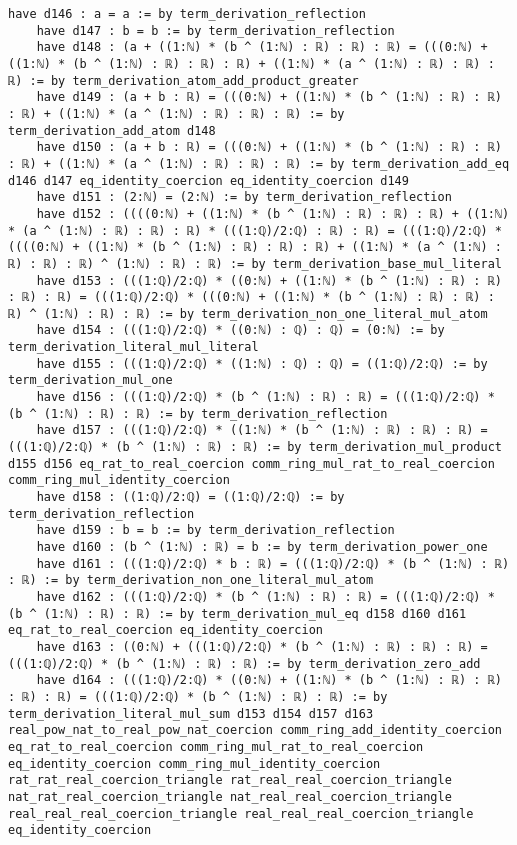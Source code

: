 \documentclass{article}
\begin{document}
\begin{tcolorbox}[colback=white!10, width=\linewidth]
\begin{lstlisting}[language=Lean4]
    have d146 : a = a := by term_derivation_reflection
    have d147 : b = b := by term_derivation_reflection
    have d148 : (a + ((1:ℕ) * (b ^ (1:ℕ) : ℝ) : ℝ) : ℝ) = (((0:ℕ) + ((1:ℕ) * (b ^ (1:ℕ) : ℝ) : ℝ) : ℝ) + ((1:ℕ) * (a ^ (1:ℕ) : ℝ) : ℝ) : ℝ) := by term_derivation_atom_add_product_greater
    have d149 : (a + b : ℝ) = (((0:ℕ) + ((1:ℕ) * (b ^ (1:ℕ) : ℝ) : ℝ) : ℝ) + ((1:ℕ) * (a ^ (1:ℕ) : ℝ) : ℝ) : ℝ) := by term_derivation_add_atom d148
    have d150 : (a + b : ℝ) = (((0:ℕ) + ((1:ℕ) * (b ^ (1:ℕ) : ℝ) : ℝ) : ℝ) + ((1:ℕ) * (a ^ (1:ℕ) : ℝ) : ℝ) : ℝ) := by term_derivation_add_eq d146 d147 eq_identity_coercion eq_identity_coercion d149
    have d151 : (2:ℕ) = (2:ℕ) := by term_derivation_reflection
    have d152 : ((((0:ℕ) + ((1:ℕ) * (b ^ (1:ℕ) : ℝ) : ℝ) : ℝ) + ((1:ℕ) * (a ^ (1:ℕ) : ℝ) : ℝ) : ℝ) * (((1:ℚ)/2:ℚ) : ℝ) : ℝ) = (((1:ℚ)/2:ℚ) * ((((0:ℕ) + ((1:ℕ) * (b ^ (1:ℕ) : ℝ) : ℝ) : ℝ) + ((1:ℕ) * (a ^ (1:ℕ) : ℝ) : ℝ) : ℝ) ^ (1:ℕ) : ℝ) : ℝ) := by term_derivation_base_mul_literal
    have d153 : (((1:ℚ)/2:ℚ) * ((0:ℕ) + ((1:ℕ) * (b ^ (1:ℕ) : ℝ) : ℝ) : ℝ) : ℝ) = (((1:ℚ)/2:ℚ) * (((0:ℕ) + ((1:ℕ) * (b ^ (1:ℕ) : ℝ) : ℝ) : ℝ) ^ (1:ℕ) : ℝ) : ℝ) := by term_derivation_non_one_literal_mul_atom
    have d154 : (((1:ℚ)/2:ℚ) * ((0:ℕ) : ℚ) : ℚ) = (0:ℕ) := by term_derivation_literal_mul_literal
    have d155 : (((1:ℚ)/2:ℚ) * ((1:ℕ) : ℚ) : ℚ) = ((1:ℚ)/2:ℚ) := by term_derivation_mul_one
    have d156 : (((1:ℚ)/2:ℚ) * (b ^ (1:ℕ) : ℝ) : ℝ) = (((1:ℚ)/2:ℚ) * (b ^ (1:ℕ) : ℝ) : ℝ) := by term_derivation_reflection
    have d157 : (((1:ℚ)/2:ℚ) * ((1:ℕ) * (b ^ (1:ℕ) : ℝ) : ℝ) : ℝ) = (((1:ℚ)/2:ℚ) * (b ^ (1:ℕ) : ℝ) : ℝ) := by term_derivation_mul_product d155 d156 eq_rat_to_real_coercion comm_ring_mul_rat_to_real_coercion comm_ring_mul_identity_coercion
    have d158 : ((1:ℚ)/2:ℚ) = ((1:ℚ)/2:ℚ) := by term_derivation_reflection
    have d159 : b = b := by term_derivation_reflection
    have d160 : (b ^ (1:ℕ) : ℝ) = b := by term_derivation_power_one
    have d161 : (((1:ℚ)/2:ℚ) * b : ℝ) = (((1:ℚ)/2:ℚ) * (b ^ (1:ℕ) : ℝ) : ℝ) := by term_derivation_non_one_literal_mul_atom
    have d162 : (((1:ℚ)/2:ℚ) * (b ^ (1:ℕ) : ℝ) : ℝ) = (((1:ℚ)/2:ℚ) * (b ^ (1:ℕ) : ℝ) : ℝ) := by term_derivation_mul_eq d158 d160 d161 eq_rat_to_real_coercion eq_identity_coercion
    have d163 : ((0:ℕ) + (((1:ℚ)/2:ℚ) * (b ^ (1:ℕ) : ℝ) : ℝ) : ℝ) = (((1:ℚ)/2:ℚ) * (b ^ (1:ℕ) : ℝ) : ℝ) := by term_derivation_zero_add
    have d164 : (((1:ℚ)/2:ℚ) * ((0:ℕ) + ((1:ℕ) * (b ^ (1:ℕ) : ℝ) : ℝ) : ℝ) : ℝ) = (((1:ℚ)/2:ℚ) * (b ^ (1:ℕ) : ℝ) : ℝ) := by term_derivation_literal_mul_sum d153 d154 d157 d163 real_pow_nat_to_real_pow_nat_coercion comm_ring_add_identity_coercion eq_rat_to_real_coercion comm_ring_mul_rat_to_real_coercion eq_identity_coercion comm_ring_mul_identity_coercion rat_rat_real_coercion_triangle rat_real_real_coercion_triangle nat_rat_real_coercion_triangle nat_real_real_coercion_triangle real_real_real_coercion_triangle real_real_real_coercion_triangle eq_identity_coercion

\end{lstlisting}
\end{tcolorbox}
\end{document}
